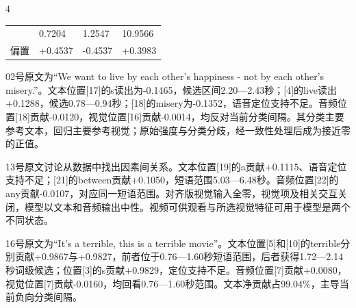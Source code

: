 \begin{PaperTable}{4}
\begin{table}[!htbp]
\begin{tabular}{@{}llll@{}}
\begin{minipage}[t]{\dimexpr 0.340000\linewidth-2.040000\tabcolsep\relax}
\end{minipage} & \begin{minipage}[t]{\dimexpr 0.220000\linewidth-1.320000\tabcolsep\relax}\raggedright
0.7204\strut
\end{minipage} & \begin{minipage}[t]{\dimexpr 0.220000\linewidth-1.320000\tabcolsep\relax}\raggedright
1.2547\strut
\end{minipage} & \begin{minipage}[t]{\dimexpr 0.220000\linewidth-1.320000\tabcolsep\relax}\raggedright
10.9566\strut
\end{minipage}\tabularnewline
\begin{minipage}[t]{\dimexpr 0.340000\linewidth-2.040000\tabcolsep\relax}\raggedright
偏置\strut
\end{minipage} & \begin{minipage}[t]{\dimexpr 0.220000\linewidth-1.320000\tabcolsep\relax}\raggedright
+0.4537\strut
\end{minipage} & \begin{minipage}[t]{\dimexpr 0.220000\linewidth-1.320000\tabcolsep\relax}\raggedright
-0.4537\strut
\end{minipage} & \begin{minipage}[t]{\dimexpr 0.220000\linewidth-1.320000\tabcolsep\relax}\raggedright
+0.3983\strut
\end{minipage}\tabularnewline
\bottomrule
\end{tabular}
\end{table}

\end{PaperTable}

02号原文为``We want to live by each other's happiness - not by each other's misery.''。文本位置{[}17{]}的s读出为-0.1465，候选区间2.20---2.43秒；{[}4{]}的live读出+0.1288，候选0.78---0.94秒；{[}18{]}的misery为-0.1352，语音定位支持不足。音频位置{[}18{]}贡献-0.0120，视觉位置{[}16{]}贡献-0.0014，均反对当前分类间隔。其分类主要参考文本，回归主要参考视觉；原始强度与分类分歧，经一致性处理后成为接近零的正值。

13号原文讨论从数据中找出因素间关系。文本位置{[}19{]}的a贡献+0.1115、语音定位支持不足；{[}21{]}的between贡献+0.1050，短语范围5.03---6.48秒。音频位置{[}22{]}的any贡献-0.0107，对应同一短语范围。对齐版视觉输入全零，视觉项及相关交互关闭，模型以文本和音频输出中性。视频可供观看与所选视觉特征可用于模型是两个不同状态。

16号原文为``It's a terrible, this is a terrible movie''。文本位置{[}5{]}和{[}10{]}的terrible分别贡献+0.9867与+0.9827，前者位于0.76---1.60秒短语范围，后者获得1.72---2.14秒词级候选；位置{[}3{]}的s贡献+0.9829，定位支持不足。音频位置{[}7{]}贡献+0.0080，视觉位置{[}7{]}贡献-0.0160，均回看0.76---1.60秒范围。文本净贡献占99.04\%，主导当前负向分类间隔。

